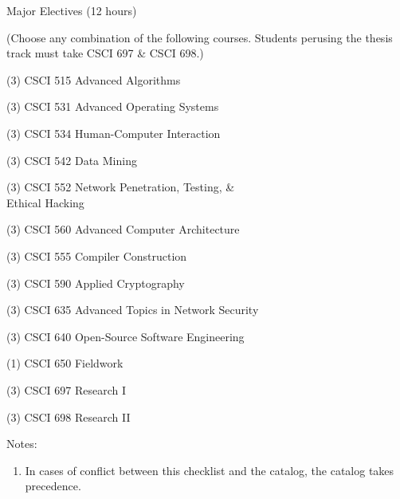 \begin{reqgroup}{Major Electives (12 hours)}
\begin{center}%
(Choose any combination of the following courses. Students perusing the thesis track must take CSCI 697 \& CSCI 698.)\vspace{-0.5em}%
\end{center}%
\begin{checklist}
\begin{minipage}[t]{0.5\linewidth}
	\item (3) CSCI 515  Advanced Algorithms
	\item (3) CSCI 531  Advanced Operating Systems
	\item (3) CSCI 534  Human-Computer Interaction
	\item (3) CSCI 542  Data Mining
	\item (3) CSCI 552  Network Penetration, Testing, \&\\Ethical Hacking
	\item (3) CSCI 560  Advanced Computer Architecture
	\item (3) CSCI 555  Compiler Construction %
\end{minipage}
\begin{minipage}[t]{0.5\linewidth}
	\item (3) CSCI 590  Applied Cryptography
	\item (3) CSCI 635  Advanced Topics in Network Security
	\item (3) CSCI 640  Open-Source Software Engineering %
	\item (1) CSCI 650  Fieldwork
	\item (3) CSCI 697  Research I
	\item (3) CSCI 698  Research II
\end{minipage}
\end{checklist}
\end{reqgroup}

Notes:%
\begin{enumerate}\footnotesize
	\item In cases of conflict between this checklist and the catalog, the catalog takes precedence.
\end{enumerate}